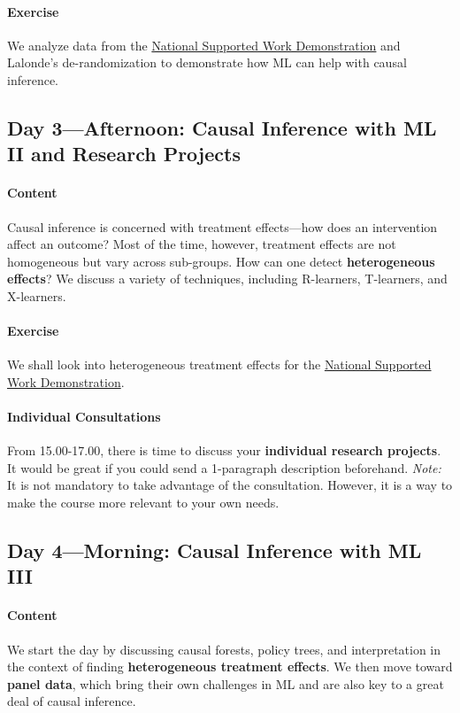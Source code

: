 \documentclass{article}
\begin{document}
\paragraph{Exercise}
We analyze data from the \href{https://www.ojp.gov/pdffiles1/Digitization/59202NCJRS.pdf}{National Supported Work Demonstration} and Lalonde's de-randomization to demonstrate how ML can help with causal inference.

\subsection{Day 3---Afternoon: Causal Inference with ML II and Research Projects}
\paragraph{Content}
Causal inference is concerned with treatment effects---how does an intervention affect an outcome? Most of the time, however, treatment effects are not homogeneous but vary across sub-groups. How can one detect \textbf{heterogeneous effects}? We discuss a variety of techniques, including R-learners, T-learners, and X-learners.

\paragraph{Exercise}
We shall look into heterogeneous treatment effects for the \href{https://www.ojp.gov/pdffiles1/Digitization/59202NCJRS.pdf}{National Supported Work Demonstration}.

\paragraph{Individual Consultations}
From 15.00-17.00, there is time to discuss your \textbf{individual research projects}. It would be great if you could send a 1-paragraph description beforehand. \emph{Note:} It is not mandatory to take advantage of the consultation. However, it is a way to make the course more relevant to your own needs.

\subsection{Day 4---Morning: Causal Inference with ML III}
\paragraph{Content}
We start the day by discussing causal forests, policy trees, and interpretation in the context of finding \textbf{heterogeneous treatment effects}. We then move toward \textbf{panel data}, which bring their own challenges in ML and are also key to a great deal of causal inference.
\end{document}
